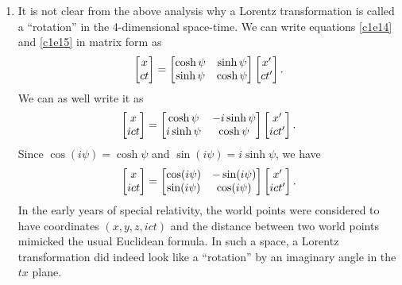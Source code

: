 \begin{enumerate}
\item It is not clear from the above analysis why a Lorentz transformation is
called a ``rotation'' in the 4-dimensional space-time. We can write equations 
\eqref{c1e14} and \eqref{c1e15} in matrix form as
\begin{equation}\label{c1e25}
\begin{bmatrix}x \\ ct \end{bmatrix} = \begin{bmatrix} \cosh\psi & \sinh\psi \\
\sinh\psi & \cosh\psi \end{bmatrix}\begin{bmatrix}x^\prime \\ ct^\prime \end{bmatrix}.
\end{equation}
We can as well write it as
\begin{equation}\label{c1e26}
\begin{bmatrix}x \\ ict \end{bmatrix} = \begin{bmatrix} \cosh\psi & -i\sinh\psi \\
i\sinh\psi & \cosh\psi \end{bmatrix}\begin{bmatrix}x^\prime \\ ict^\prime \end{bmatrix}.
\end{equation}
Since $\cos(i\psi) = \cosh\psi$ and $\sin(i\psi) = i\sinh\psi$, we have
\begin{equation}\label{c1e27}
\begin{bmatrix}x \\ ict \end{bmatrix} = \begin{bmatrix} \cos(i\psi) & -\sin(i\psi) \\
\sin(i\psi) & \cos(i\psi) \end{bmatrix}\begin{bmatrix}x^\prime \\ ict^\prime \end{bmatrix}.
\end{equation}
In the early years of special relativity, the world points were considered to have
coordinates $(x, y, z, ict)$ and the distance between two world points mimicked the
usual Euclidean formula. In such a space, a Lorentz transformation did indeed look
like a ``rotation'' by an imaginary angle in the $tx$ plane.


\end{enumerate}
